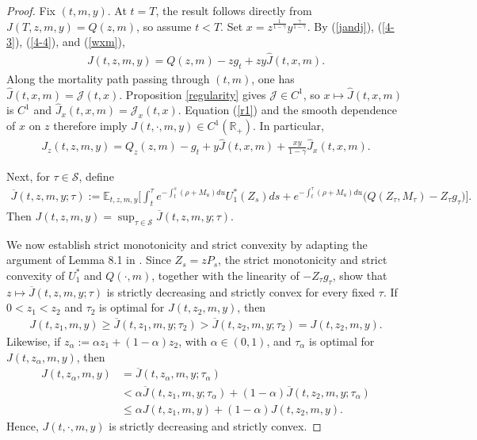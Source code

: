 \documentclass[a4paper,11pt]{amsart}
\numberwithin{equation}{section}
\newcommand{\blue}[1]{{\color{black}#1}}
\begin{document}
{\begin{proof}
Fix $(t,m,y)$. At $t=T$, the result follows directly from $J(T,z,m,y)=Q(z,m)$, so assume $t<T$. Set $x=z^{\frac{1}{1-\gamma}}y^{\frac{\gamma}{1-\gamma}}$. By (\ref{jandj}), (\ref{4-3}), (\ref{4-4}), and (\ref{wxm}),
\begin{align}\label{r1}
J(t,z,m,y)=Q(z,m)-zg_t+zy\widehat J(t,x,m).
\end{align}
\blue{Along the mortality path passing through $(t,m)$, one has $\widehat J(t,x,m)=\mathcal J(t,x)$. Proposition \ref{regularity} gives $\mathcal J\in C^1$, so $x\mapsto\widehat J(t,x,m)$ is $C^1$ and $\widehat J_x(t,x,m)=\mathcal J_x(t,x)$. Equation (\ref{r1}) and the smooth dependence of $x$ on $z$ therefore imply $J(t,\cdot,m,y)\in C^1(\mathbb R_+)$. In particular,}
\begin{align}\label{Jzformula}
J_z(t,z,m,y)=Q_z(z,m)-g_t+y\widehat J(t,x,m)+\frac{xy}{1-\gamma}\widehat J_x(t,x,m).
\end{align}

Next, for $\tau\in\mathcal S$, define
\begin{align*}
\overline J(t,z,m,y;\tau):=\mathbb E_{t,z,m,y}\bigg[\int_t^\tau e^{-\int_t^s(\rho+M_u)du}U_1^\ast(Z_s)ds+e^{-\int_t^\tau(\rho+M_u)du}\big(Q(Z_\tau,M_\tau)-Z_\tau g_\tau\big)\bigg].
\end{align*}
Then $J(t,z,m,y)=\sup_{\tau\in\mathcal S}\overline J(t,z,m,y;\tau)$.


 We now establish strict monotonicity and strict convexity by adapting the argument of Lemma 8.1 in \citet{karatzas2000utility}. Since $Z_s=zP_s$, the strict monotonicity and strict convexity of $U_1^\ast$ and $Q(\cdot,m)$, together with the linearity of $-Z_\tau g_\tau$, show that $z\mapsto\overline J(t,z,m,y;\tau)$ is strictly decreasing and strictly convex for every fixed $\tau$. If $0<z_1<z_2$ and $\tau_2$ is optimal for $J(t,z_2,m,y)$, then
\begin{align*}
J(t,z_1,m,y)\geq\overline J(t,z_1,m,y;\tau_2)>\overline J(t,z_2,m,y;\tau_2)=J(t,z_2,m,y).
\end{align*}
Likewise, if $z_\alpha:=\alpha z_1+(1-\alpha)z_2$, with $\alpha\in(0,1)$, and $\tau_\alpha$ is optimal for $J(t,z_\alpha,m,y)$, then
\begin{align*}
J(t,z_\alpha,m,y)&=\overline J(t,z_\alpha,m,y;\tau_\alpha)\\
&<\alpha\overline J(t,z_1,m,y;\tau_\alpha)+(1-\alpha)\overline J(t,z_2,m,y;\tau_\alpha)\\
&\leq\alpha J(t,z_1,m,y)+(1-\alpha)J(t,z_2,m,y).
\end{align*}
Hence, $J(t,\cdot,m,y)$ is strictly decreasing and strictly convex.


\end{proof}}
\end{document}
